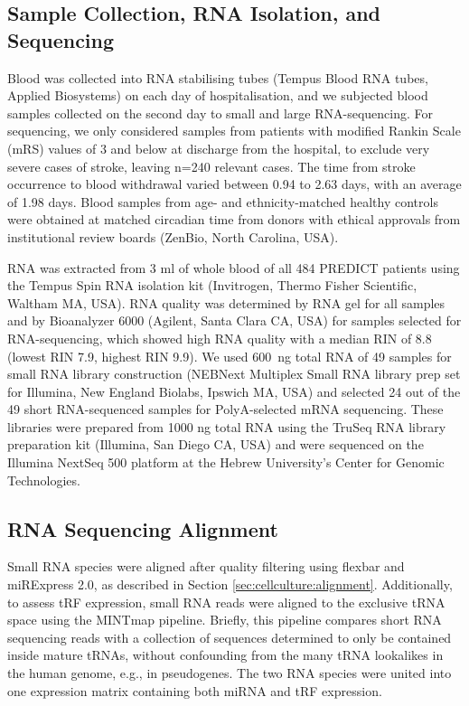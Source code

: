 \begin{method}
\subsection{Sample Collection, RNA Isolation, and Sequencing}
Blood was collected into RNA stabilising tubes (Tempus Blood RNA tubes, Applied Biosystems) on each day of hospitalisation, and we subjected blood samples collected on the second day to small and large RNA-sequencing. For sequencing, we only considered samples from patients with modified Rankin Scale (mRS) values of 3 and below at discharge from the hospital, to exclude very severe cases of stroke, leaving n=240 relevant cases. The time from stroke occurrence to blood withdrawal varied between 0.94 to 2.63 days, with an average of 1.98 days. Blood samples from age- and ethnicity-matched healthy controls were obtained at matched circadian time from donors with ethical approvals from institutional review boards (ZenBio, North Carolina, USA).

RNA was extracted from 3 ml of whole blood of all 484 PREDICT patients using the Tempus Spin RNA isolation kit (Invitrogen, Thermo Fisher Scientific, Waltham MA, USA). RNA quality was determined by RNA gel for all samples and by Bioanalyzer 6000 (Agilent, Santa Clara CA, USA) for samples selected for RNA-sequencing, which showed high RNA quality with a median RIN of 8.8 (lowest RIN 7.9, highest RIN 9.9). We used 600 ng total RNA of 49 samples for small RNA library construction (NEBNext Multiplex Small RNA library prep set for Illumina, New England Biolabs, Ipswich MA, USA) and selected 24 out of the 49 short RNA-sequenced samples for PolyA-selected mRNA sequencing. These libraries were prepared from 1000 ng total RNA using the TruSeq RNA library preparation kit (Illumina, San Diego CA, USA) and were sequenced on the Illumina NextSeq 500 platform at the Hebrew University’s Center for Genomic Technologies.

\subsection{RNA Sequencing Alignment} \label{sec:stroke:alignment}
Small RNA species were aligned after quality filtering using flexbar and miRExpress 2.0, as described in Section \ref{sec:cellculture:alignment}. Additionally, to assess tRF expression, small RNA reads were aligned to the exclusive tRNA space using the MINTmap pipeline.\cite{Loher2017} Briefly, this pipeline compares short RNA sequencing reads with a collection of sequences determined to only be contained inside mature tRNAs, without confounding from the many tRNA lookalikes in the human genome, e.g., in pseudogenes. The two RNA species were united into one expression matrix containing both miRNA and tRF expression.


\end{method}
